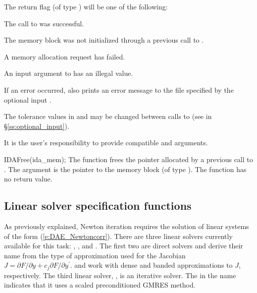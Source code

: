 {
  The return flag  (of type ) will be one of the following:
  \begin{args}
  \item[\Id{IDA\_SUCCESS}]
    The call to  was successful.
  \item[\Id{IDA\_MEM\_NULL}] 
    The {\ida} memory block was not initialized through a previous call to .
  \item[\Id{IDA\_MEM\_FAIL}] 
    A memory allocation request has failed.
  \item[\Id{IDA\_ILL\_INPUT}] 
    An input argument to  has an illegal value.
  \end{args}
}
{
  If an error occurred,  also prints an error message to the
  file specified by the optional input .

  The tolerance values in  and  may be changed between
  calls to  (see  in \S\ref{ss:optional_input}).

  {\warn} It is the user's responsibility to provide compatible  and
   arguments.
}
{
  IDAFree(ida\_mem);
}
{
  The function  frees the pointer allocated by
  a previous call to .
}
{
  The argument is the pointer to the {\ida} memory block (of type ).
}
{
  The function  has no return value.
}
{}
\subsection{Linear solver specification functions}\label{sss:lin_solv_init}

As previously explained, Newton iteration requires the solution of
linear systems of the form (\ref{e:DAE_Newtoncorr}).  There are three {\ida} linear
solvers currently available for this task: {\idadense}, {\idaband}, 
and {\idaspgmr}.  The first two are direct solvers and derive their name
from the type of approximation used for the Jacobian 
$J = \partial{F}/\partial{y} + c_j \partial{F}/\partial{y^\prime}$.
{\idadense} and {\idaband} work with
dense and banded approximations to $J$, respectively.  The
third {\ida} linear solver, {\idaspgmr}, is an iterative solver.  
The {\spgmr} in the name indicates that it uses a scaled preconditioned
GMRES method.

